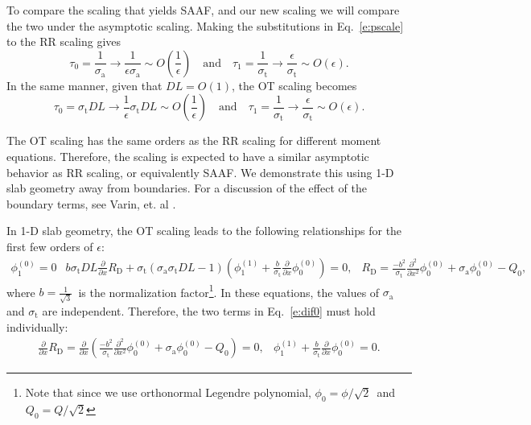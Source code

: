 \documentclass[review]{elsarticle}
\newcommand{\px}{\frac{\partial}{\partial x}}
\newcommand{\st}{\sigma_\mathrm{t}}
\newcommand{\pxt}{\frac{\partial^2}{\partial x^2}}
\newcommand{\siga}{\sigma_\mathrm{a}}
\newcommand{\lp}{\left(}
\newcommand{\rp}{\right)}
\newcommand{\quand}{\quad\mathrm{and}\quad}
\newcommand{\pord}[2]{\phi_{#1}^{(#2)}}
\begin{document}
To compare the scaling that yields SAAF, and our new scaling we will compare the two under the asymptotic scaling. Making the substitutions in Eq.~\eqref{e:pscale} to the RR scaling gives
\begin{equation}
\tau_0=\frac{1}{\siga}\to\frac{1}{\epsilon\siga}\sim O\lp\frac{1}{\epsilon}\rp\quand\tau_1=\frac{1}{\st}\to\frac{\epsilon}{\st}\sim O\lp\epsilon\rp.
\end{equation}
In the same manner, given that $DL = O(1)$, the OT scaling becomes
\begin{equation}
\tau_0=\st DL\to\frac{1}{\epsilon}\st DL\sim O\lp\frac{1}{\epsilon}\rp\quand\tau_1=\frac{1}{\st}\to\frac{\epsilon}{\st}\sim O\lp\epsilon\rp.
\end{equation}

The OT scaling has the same orders as the RR scaling for different moment equations. Therefore, the scaling is expected to have a similar asymptotic behavior as RR scaling, or equivalently SAAF. We demonstrate this using 1-D slab geometry away from boundaries. For a discussion of the effect of the boundary terms, see Varin, et. al \cite{varin_lspn}.

In 1-D slab geometry, the OT scaling leads to the following relationships for the first few orders of $\epsilon$:
\begin{subequations}
	\begin{align}
	\pord{1}{0}=0
	\end{align}
	\begin{align}\label{e:dif0}
	b\st DL\px R_\mathrm{D}+\st(\siga\st DL-1)\left(\pord{1}{1}+\frac{b}{\st}\px\pord{0}{0}\right)=0,
	\end{align}
	\begin{align}
	R_\mathrm{D}=\frac{-b^2}{\st}\pxt\pord{0}{0}+\siga\pord{0}{0}-Q_0,
	\end{align}
\end{subequations}
where $b=\frac{1}{\sqrt{3}}$\ is the normalization factor\footnote{Note that since we use orthonormal Legendre polynomial, $\phi_0=\phi/\sqrt{2}$\ and $Q_0=Q/\sqrt{2}$}. In these equations, the values of $\sigma_\mathrm{a}$ and $\sigma_\mathrm{t}$ are independent. Therefore, the two terms in  Eq.\ \eqref{e:dif0} must hold individually:
\begin{subequations}
	\begin{align}\label{e:dif1}
	\px R_\mathrm{D}=\px\left(\frac{-b^2}{\st}\pxt\pord{0}{0}+\siga\pord{0}{0}-Q_0\right)= 0,
	\end{align}
	\begin{align}\label{e:fick}
	\pord{1}{1}+\frac{b}{\st}\px\pord{0}{0}= 0.
	\end{align}
\end{subequations}
\end{document}

